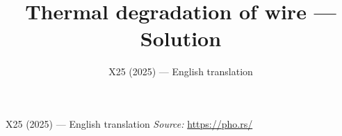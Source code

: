 \documentclass[11pt,a4paper]{article}
\title{\textbf{Thermal degradation of wire --- Solution}}
\author{\normalsize X25 (2025) — English translation}
\date{}
\begin{document}
\maketitle
X25 (2025) — English translation
\vspace{1em}
\noindent\textit{Source:} \url{https://pho.rs/}
\end{document}
